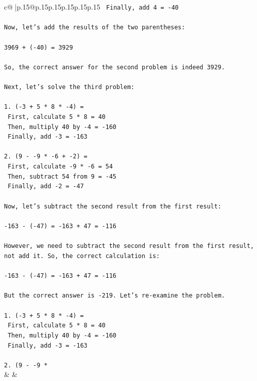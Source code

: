 \documentclass{article}
\begin{document}
{\begin{supertabular}{c@{$\;$}|p{.15\linewidth}@{}p{.15\linewidth}p{.15\linewidth}p{.15\linewidth}p{.15\linewidth}p{.15\linewidth}}
{{{\texttt{   Finally, add 4 = {-}40} \\
\\ 
\texttt{Now, let's add the results of the two parentheses:} \\
\\ 
\texttt{3969 + ({-}40) = 3929} \\
\\ 
\texttt{So, the correct answer for the second problem is indeed 3929.} \\
\\ 
\texttt{Next, let's solve the third problem:} \\
\\ 
\texttt{1. ({-}3 + 5 * 8 * {-}4) = } \\
\texttt{   First, calculate 5 * 8 = 40} \\
\texttt{   Then, multiply 40 by {-}4 = {-}160} \\
\texttt{   Finally, add {-}3 = {-}163} \\
\\ 
\texttt{2. (9 {-} {-}9 * {-}6 + {-}2) = } \\
\texttt{   First, calculate {-}9 * {-}6 = 54} \\
\texttt{   Then, subtract 54 from 9 = {-}45} \\
\texttt{   Finally, add {-}2 = {-}47} \\
\\ 
\texttt{Now, let's subtract the second result from the first result:} \\
\\ 
\texttt{{-}163 {-} ({-}47) = {-}163 + 47 = {-}116} \\
\\ 
\texttt{However, we need to subtract the second result from the first result, not add it. So, the correct calculation is:} \\
\\ 
\texttt{{-}163 {-} ({-}47) = {-}163 + 47 = {-}116} \\
\\ 
\texttt{But the correct answer is {-}219. Let's re{-}examine the problem.} \\
\\ 
\texttt{1. ({-}3 + 5 * 8 * {-}4) = } \\
\texttt{   First, calculate 5 * 8 = 40} \\
\texttt{   Then, multiply 40 by {-}4 = {-}160} \\
\texttt{   Finally, add {-}3 = {-}163} \\
\\ 
\texttt{2. (9 {-} {-}9 *} \\
            }
        }
    }
    & & \\ \\


\end{supertabular}}
\end{document}
